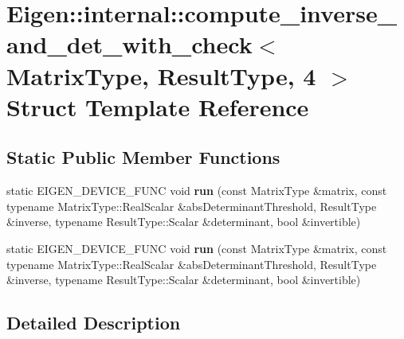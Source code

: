 \hypertarget{struct_eigen_1_1internal_1_1compute__inverse__and__det__with__check_3_01_matrix_type_00_01_result_type_00_014_01_4}{}\section{Eigen\+:\+:internal\+:\+:compute\+\_\+inverse\+\_\+and\+\_\+det\+\_\+with\+\_\+check$<$ Matrix\+Type, Result\+Type, 4 $>$ Struct Template Reference}
\label{struct_eigen_1_1internal_1_1compute__inverse__and__det__with__check_3_01_matrix_type_00_01_result_type_00_014_01_4}
\subsection*{Static Public Member Functions}
\begin{DoxyCompactItemize}
\item 
\mbox{\label{struct_eigen_1_1internal_1_1compute__inverse__and__det__with__check_3_01_matrix_type_00_01_result_type_00_014_01_4_abe35a5b8a514af880fd4cdd8186b1918}} 
static E\+I\+G\+E\+N\+\_\+\+D\+E\+V\+I\+C\+E\+\_\+\+F\+U\+NC void {\bfseries run} (const Matrix\+Type \&matrix, const typename Matrix\+Type\+::\+Real\+Scalar \&abs\+Determinant\+Threshold, Result\+Type \&inverse, typename Result\+Type\+::\+Scalar \&determinant, bool \&invertible)
\item 
\mbox{\label{struct_eigen_1_1internal_1_1compute__inverse__and__det__with__check_3_01_matrix_type_00_01_result_type_00_014_01_4_abe35a5b8a514af880fd4cdd8186b1918}} 
static E\+I\+G\+E\+N\+\_\+\+D\+E\+V\+I\+C\+E\+\_\+\+F\+U\+NC void {\bfseries run} (const Matrix\+Type \&matrix, const typename Matrix\+Type\+::\+Real\+Scalar \&abs\+Determinant\+Threshold, Result\+Type \&inverse, typename Result\+Type\+::\+Scalar \&determinant, bool \&invertible)
\end{DoxyCompactItemize}


\subsection{Detailed Description}
